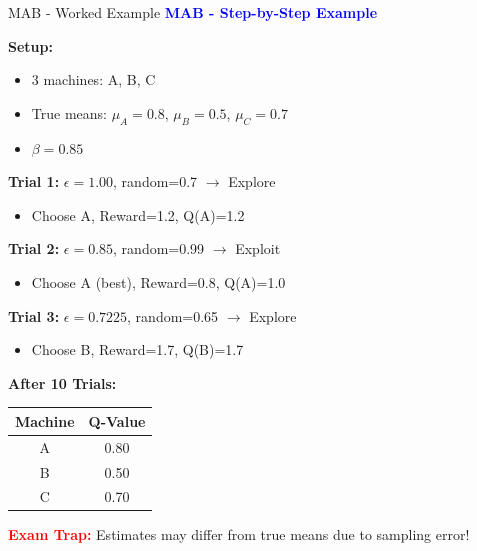 \documentclass[8pt]{beamer}
\begin{document}
	\begin{frame}{MAB - Worked Example}
		\fontsize{6.5}{7.5}\selectfont
		\textcolor{blue}{\textbf{MAB - Step-by-Step Example}}
		
		\textbf{Setup:}
		\begin{itemize}
			\item 3 machines: A, B, C
			\item True means: $\mu_A = 0.8$, $\mu_B = 0.5$, $\mu_C = 0.7$
			\item $\beta = 0.85$
		\end{itemize}
		
		\textbf{Trial 1:} $\epsilon = 1.00$, random=0.7 $\rightarrow$ Explore
		\begin{itemize}
			\item Choose A, Reward=1.2, Q(A)=1.2
		\end{itemize}
		
		\textbf{Trial 2:} $\epsilon = 0.85$, random=0.99 $\rightarrow$ Exploit
		\begin{itemize}
			\item Choose A (best), Reward=0.8, Q(A)=1.0
		\end{itemize}
		
		\textbf{Trial 3:} $\epsilon = 0.7225$, random=0.65 $\rightarrow$ Explore
		\begin{itemize}
			\item Choose B, Reward=1.7, Q(B)=1.7
		\end{itemize}
		
		\textbf{After 10 Trials:}
		\begin{tabular}{|c|c|}
			\hline
			Machine & Q-Value \\
			\hline
			A & 0.80 \\
			\hline
			B & 0.50 \\
			\hline
			C & 0.70 \\
			\hline
		\end{tabular}
		
		\textcolor{red}{\textbf{Exam Trap:}} Estimates may differ from true means due to sampling error!
	\end{frame}
	
\end{document}
